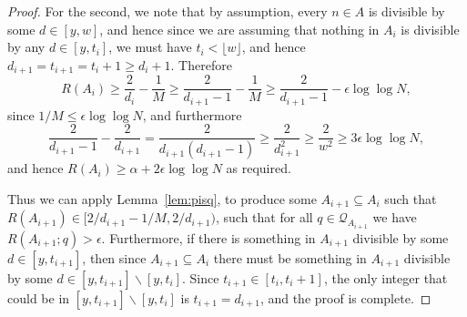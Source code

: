\begin{proof}
For the second, we note that by assumption, every $n\in A$ is divisible by some $d\in [y,w]$, and hence since we are assuming that nothing in $A_i$ is divisible by any $d\in [y,t_i]$, we must have $t_i<\lfloor w\rfloor$, and hence $d_{i+1}=t_{i+1}=t_i+1\geq d_i+1$. Therefore
\[R(A_i)\geq \frac{2}{d_i}-\frac{1}{M}\geq \frac{2}{d_{i+1}-1}-\frac{1}{M}\geq \frac{2}{d_{i+1}-1}-\epsilon\log\log N,\]
since $1/M \leq \epsilon\log\log N$, and furthermore
\[\frac{2}{d_{i+1}-1}-\frac{2}{d_{i+1}}=\frac{2}{d_{i+1}(d_{i+1}-1)}\geq \frac{2}{d_{i+1}^2}\geq \frac{2}{w^2}\geq 3\epsilon\log\log N,\]
and hence $R(A_i)\geq \alpha+2\epsilon\log\log N$ as required.

Thus we can apply Lemma~\ref{lem:pisq}, to produce some $A_{i+1}\subseteq A_i$ such that $R(A_{i+1})\in [2/d_{i+1}-1/M,2/d_{i+1})$, such that for all $q\in \mathcal{Q}_{A_{i+1}}$ we have $R(A_{i+1};q)>\epsilon$. Furthermore, if there is something in $A_{i+1}$ divisible by some $d\in [y,t_{i+1}]$, then since $A_{i+1}\subseteq A_i$ there must be something in $A_{i+1}$ divisible by some $d\in [y,t_{i+1}]\backslash [y,t_i]$. Since $t_{i+1}\in [t_i,t_i+1]$, the only integer that could be in $[y,t_{i+1}]\backslash [y,t_i]$ is $t_{i+1}=d_{i+1}$, and the proof is complete.
\end{proof}

